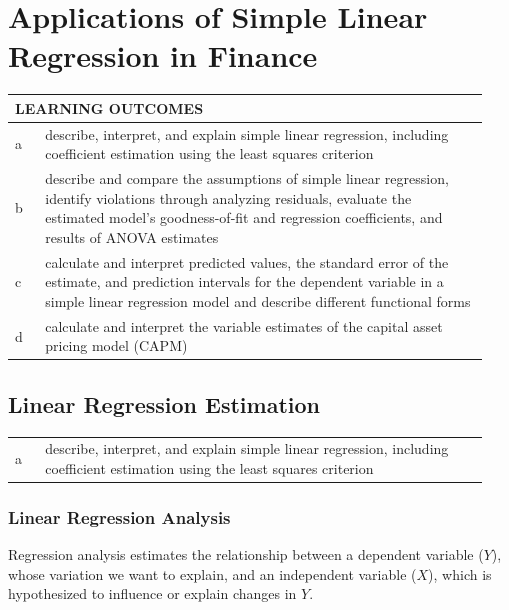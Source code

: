 \chapter{Applications of Simple Linear Regression in Finance}
\label{chap:Applications of Simple Linear Regression in Finance}

\begin{center}
\begin{tabular}{p{0.06\linewidth} | p{0.88\linewidth}}
	\toprule
	\multicolumn{2}{l}{\textbf{LEARNING OUTCOMES}} \\
	\midrule
	a & describe, interpret, and explain simple linear regression, including coefficient estimation using the least squares criterion \\
	\midrule
	b & describe and compare the assumptions of simple linear regression, identify violations through analyzing residuals, evaluate the estimated model's goodness-of-fit and regression coefficients, and results of ANOVA estimates \\
	\midrule
	c & calculate and interpret predicted values, the standard error of the estimate, and prediction intervals for the dependent variable in a simple linear regression model and describe different functional forms \\
	\midrule
	d & calculate and interpret the variable estimates of the capital asset pricing model (CAPM) \\
	\bottomrule
\end{tabular}
\end{center}

\vspace{1.5em}

\section{Linear Regression Estimation}
\label{sec:Linear Regression Estimation}

\begin{center}
\begin{tabular}{p{0.06\linewidth} | p{0.88\linewidth}}
	a & describe, interpret, and explain simple linear regression, including coefficient estimation using the least squares criterion \\
\end{tabular}
\end{center}

\subsection{Linear Regression Analysis}
Regression analysis estimates the relationship between a dependent variable ($Y$), whose variation we want to explain, and an independent variable ($X$), which is hypothesized to influence or explain changes in $Y$. 

